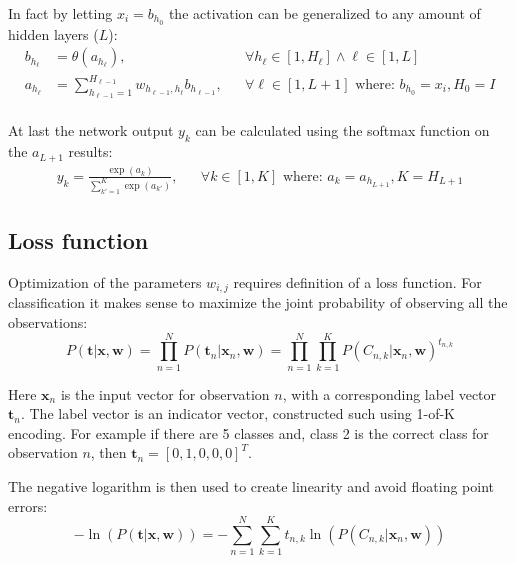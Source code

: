 In fact by letting $x_i = b_{h_0}$ the activation can be generalized to any amount of hidden layers ($L$):
\begin{equation}
\begin{aligned}
b_{h_\ell} &= \theta(a_{h_\ell}), && \forall h_{\ell} \in [1, H_{\ell}] \wedge \ell \in [1, L] \\
a_{h_\ell} &= \sum_{h_{\ell-1} = 1}^{H_{\ell-1}} w_{h_{\ell-1}, h_{\ell}} b_{h_{\ell-1}}, && \forall \ell \in [1, L+1] \text{ where: } b_{h_0} = x_i, H_0 = I \\
\end{aligned}
\end{equation}

At last the network output $y_k$ can be calculated using the softmax function on the $a_{L+1}$ results:
\begin{equation}
\begin{aligned}
y_k = \frac{\exp(a_k)}{\sum_{k'=1}^K \exp(a_{k'})}, && \forall k \in [1, K] \text{ where: } a_k=a_{h_{L+1}}, K = H_{L + 1}
\end{aligned}
\label{eq:theory:ffnn:y}
\end{equation}

\subsection{Loss function}

Optimization of the parameters $w_{i,j}$ requires definition of a loss function. For classification it makes sense to maximize the joint probability of observing all the observations:
\begin{equation}
P(\mathbf{t} | \mathbf{x}, \mathbf{w}) = \prod_{n=1}^N P(\mathbf{t}_n | \mathbf{x}_n, \mathbf{w})  = \prod_{n=1}^N \prod_{k=1}^K P(C_{n, k} | \mathbf{x}_n, \mathbf{w})^{t_{n, k}}
\end{equation}

Here $\mathbf{x}_{n}$ is the input vector for observation $n$, with a corresponding label vector $\mathbf{t}_n$. The label vector is an indicator vector, constructed such using 1-of-K encoding. For example if there are 5 classes and, class 2 is the correct class for observation $n$, then $\mathbf{t}_n = [0, 1, 0, 0, 0]^T$.

The negative logarithm is then used to create linearity and avoid floating point errors:
\begin{equation}
- \ln\left(P(\mathbf{t} | \mathbf{x}, \mathbf{w})\right) = - \sum_{n=1}^N \sum_{k=1}^K t_{n, k} \ln\left( P(C_{n, k} | \mathbf{x}_n, \mathbf{w})\right)
\end{equation}

